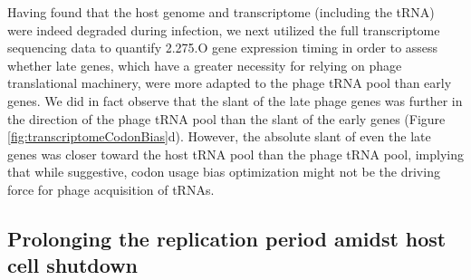 \documentclass[12pt,twoside]{mitthesis-manusdown}
\begin{document}
Having found that the host genome and transcriptome (including the tRNA)
were indeed degraded during infection, we next utilized the full
transcriptome sequencing data to quantify 2.275.O gene expression timing
in order to assess whether late genes, which have a greater necessity
for relying on phage translational machinery, were more adapted to the
phage tRNA pool than early genes. We did in fact observe that the slant
of the late phage genes was further in the direction of the phage tRNA
pool than the slant of the early genes (Figure
\ref{fig:transcriptomeCodonBias}d). However, the absolute slant of even
the late genes was closer toward the host tRNA pool than the phage tRNA
pool, implying that while suggestive, codon usage bias optimization
might not be the driving force for phage acquisition of tRNAs.

\subsection{Prolonging the replication period amidst host cell
shutdown}\label{prolonging-the-replication-period-amidst-host-cell-shutdown}
\end{document}
